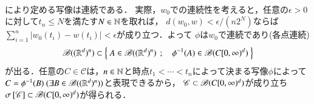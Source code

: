 \begin{prf}
\begin{align}
	\end{align}
	により定める写像は連続である．
	実際，$w_0$での連続性を考えると，任意の$\epsilon > 0$に対して$t_n \leq N$を満たす$N \in \mathbb{N}$を取れば，
	$d(w_0,w) < \epsilon/(n2^N)$ならば
	$\sum_{i=1}^{n}|w_0(t_i) - w(t_i)| < \epsilon$が成り立つ．よって
	$\phi$は$w_0$で連続であり(各点連続)
	\begin{align}
		\mathscr{B}((\mathbb{R}^d)^n) \subset \left\{\ A \in \mathscr{B}((\mathbb{R}^d)^n)\ \, ; \quad \phi^{-1}(A) \in \mathscr{B}(C[0,\infty)^d)\ \right\}
	\end{align}
	が出る．任意の$C \in \mathscr{C}$は，$n \in \mathbb{N}$と時点$t_1 < \cdots < t_n$によって決まる写像$\phi$によって
	$C = \phi^{-1}(B)\ (\exists B \in \mathscr{B}((\mathbb{R}^d)^n))$と表現できるから，
	$\mathscr{C} \subset \mathscr{B}(C[0,\infty)^d)$が成り立ち
	$\sigma \left[\mathscr{C}\right] \subset \mathscr{B}(C[0,\infty)^d)$が得られる．
	\QED
\end{prf}


